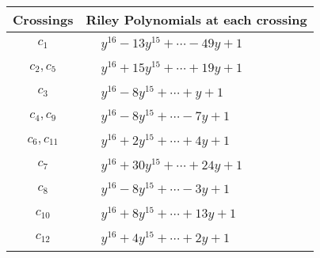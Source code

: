 \documentclass[1p]{elsarticle_modified}
\theoremstyle{definition}
\begin{document}
\begin{tabular}{m{50pt}|m{274pt}}
Crossings & \hspace{64pt}Riley Polynomials at each crossing \\
\hline $$\begin{aligned}c_{1}\end{aligned}$$&$\begin{aligned}
&y^{16}-13 y^{15}+\cdots-49 y+1
\end{aligned}$\\
\hline $$\begin{aligned}c_{2},c_{5}\end{aligned}$$&$\begin{aligned}
&y^{16}+15 y^{15}+\cdots+19 y+1
\end{aligned}$\\
\hline $$\begin{aligned}c_{3}\end{aligned}$$&$\begin{aligned}
&y^{16}-8 y^{15}+\cdots+y+1
\end{aligned}$\\
\hline $$\begin{aligned}c_{4},c_{9}\end{aligned}$$&$\begin{aligned}
&y^{16}-8 y^{15}+\cdots-7 y+1
\end{aligned}$\\
\hline $$\begin{aligned}c_{6},c_{11}\end{aligned}$$&$\begin{aligned}
&y^{16}+2 y^{15}+\cdots+4 y+1
\end{aligned}$\\
\hline $$\begin{aligned}c_{7}\end{aligned}$$&$\begin{aligned}
&y^{16}+30 y^{15}+\cdots+24 y+1
\end{aligned}$\\
\hline $$\begin{aligned}c_{8}\end{aligned}$$&$\begin{aligned}
&y^{16}-8 y^{15}+\cdots-3 y+1
\end{aligned}$\\
\hline $$\begin{aligned}c_{10}\end{aligned}$$&$\begin{aligned}
&y^{16}+8 y^{15}+\cdots+13 y+1
\end{aligned}$\\
\hline $$\begin{aligned}c_{12}\end{aligned}$$&$\begin{aligned}
&y^{16}+4 y^{15}+\cdots+2 y+1
\end{aligned}$\\
\hline
\end{tabular}\\~\\
\end{document}
